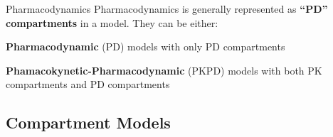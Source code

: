 \begin{frame}{Pharmacodynamics}
    Pharmacodynamics is generally represented as \textbf{``PD'' compartments} in a model.
    \vfill
    They can be either:
    \begin{vfilleditems}
        \item \textbf{Pharmacodynamic} (PD) models with only PD compartments
        \item \textbf{Phamacokynetic-Pharmacodynamic} (PKPD) models with both PK compartments and PD compartments
    \end{vfilleditems}
\end{frame}

\subsection{Compartment Models}